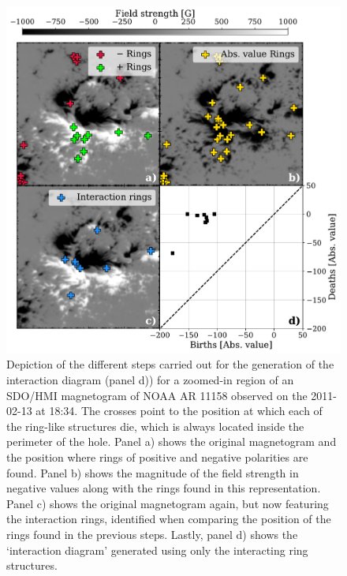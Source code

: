 \begin{figure}
  \begin{minipage}[c]{0.5\textwidth}
    \includegraphics[width=\textwidth]{figures/PersistentHomology/InteractingDiagram.pdf}
  \end{minipage}\hfill
  \begin{minipage}[c]{0.5\textwidth}
    \caption[Interaction diagram]{
      Depiction of the different steps carried out for the generation of the interaction diagram (panel d)) for a zoomed-in region of an SDO/HMI magnetogram of NOAA AR 11158 observed on the 2011-02-13 at 18:34. The crosses point to the position at which each of the ring-like structures die, which is always located inside the perimeter of the hole. Panel a) shows the original magnetogram and the position where rings of positive and negative polarities are found. Panel b) shows the magnitude of the field strength in negative values along with the rings found in this representation. Panel c) shows the original magnetogram again, but now featuring the interaction rings, identified when comparing the position of the rings found in the previous steps. Lastly, panel d) shows the `interaction diagram' generated using only the interacting ring structures.
    } \label{fig: Interacting_diagram}
  \end{minipage}
\end{figure}

